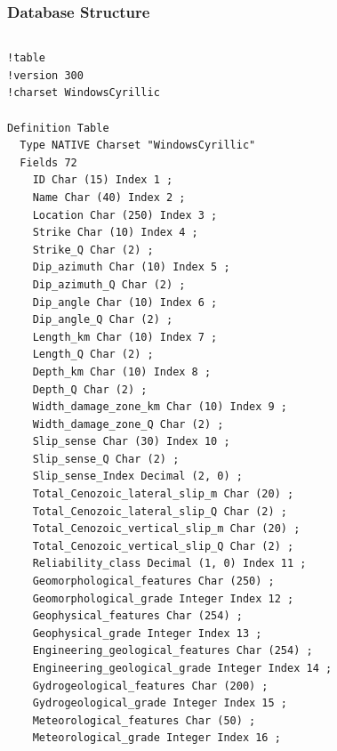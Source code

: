 \documentclass[10pt]{beamer}
\begin{document}
\begin{frame}[fragile]
  \frametitle{Database Structure}
  \begin{columns}\tiny
    \begin{column}{0.5\linewidth}
\begin{verbatim}
!table
!version 300
!charset WindowsCyrillic

Definition Table
  Type NATIVE Charset "WindowsCyrillic"
  Fields 72
    ID Char (15) Index 1 ;
    Name Char (40) Index 2 ;
    Location Char (250) Index 3 ;
    Strike Char (10) Index 4 ;
    Strike_Q Char (2) ;
    Dip_azimuth Char (10) Index 5 ;
    Dip_azimuth_Q Char (2) ;
    Dip_angle Char (10) Index 6 ;
    Dip_angle_Q Char (2) ;
    Length_km Char (10) Index 7 ;
    Length_Q Char (2) ;
    Depth_km Char (10) Index 8 ;
    Depth_Q Char (2) ;
    Width_damage_zone_km Char (10) Index 9 ;
    Width_damage_zone_Q Char (2) ;
    Slip_sense Char (30) Index 10 ;
    Slip_sense_Q Char (2) ;
    Slip_sense_Index Decimal (2, 0) ;
    Total_Cenozoic_lateral_slip_m Char (20) ;
    Total_Cenozoic_lateral_slip_Q Char (2) ;
    Total_Cenozoic_vertical_slip_m Char (20) ;
    Total_Cenozoic_vertical_slip_Q Char (2) ;
    Reliability_class Decimal (1, 0) Index 11 ;
    Geomorphological_features Char (250) ;
    Geomorphological_grade Integer Index 12 ;
    Geophysical_features Char (254) ;
    Geophysical_grade Integer Index 13 ;
    Engineering_geological_features Char (254) ;
    Engineering_geological_grade Integer Index 14 ;
    Gydrogeological_features Char (200) ;
    Gydrogeological_grade Integer Index 15 ;
    Meteorological_features Char (50) ;
    Meteorological_grade Integer Index 16 ;
\end{verbatim}
    \end{column}
    \begin{column}{0.5\linewidth}
\begin{verbatim}


\end{verbatim}
\end{column}
\end{columns}
\end{frame}
\end{document}
